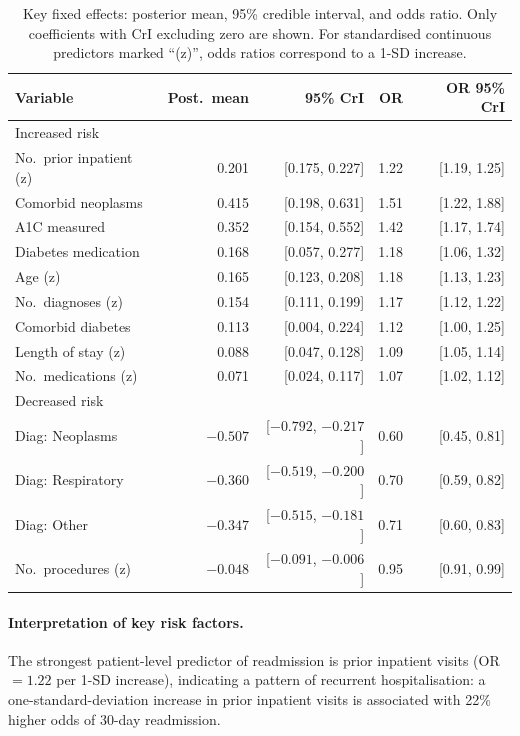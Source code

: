 \documentclass[10pt]{article}
\begin{document}
\begin{table}[H]
\centering
\small
\caption{Key fixed effects: posterior mean, 95\% credible interval, and odds
ratio.  Only coefficients with CrI excluding zero are shown. For standardised
continuous predictors marked ``(z)'', odds ratios correspond to a 1-SD increase.}
\label{tab:fixed}
\begin{tabular}{lrrrr}
\toprule
Variable & Post.\ mean & 95\% CrI & OR & OR 95\% CrI \\
\midrule
Increased risk \\
\quad No.\ prior inpatient (z) & 0.201 & [0.175, 0.227] & 1.22 & [1.19, 1.25] \\
\quad Comorbid neoplasms & 0.415 & [0.198, 0.631] & 1.51 & [1.22, 1.88] \\
\quad A1C measured & 0.352 & [0.154, 0.552] & 1.42 & [1.17, 1.74] \\
\quad Diabetes medication & 0.168 & [0.057, 0.277] & 1.18 & [1.06, 1.32] \\
\quad Age (z) & 0.165 & [0.123, 0.208] & 1.18 & [1.13, 1.23] \\
\quad No.\ diagnoses (z) & 0.154 & [0.111, 0.199] & 1.17 & [1.12, 1.22] \\
\quad Comorbid diabetes & 0.113 & [0.004, 0.224] & 1.12 & [1.00, 1.25] \\
\quad Length of stay (z) & 0.088 & [0.047, 0.128] & 1.09 & [1.05, 1.14] \\
\quad No.\ medications (z) & 0.071 & [0.024, 0.117] & 1.07 & [1.02, 1.12] \\
\midrule
Decreased risk \\
\quad Diag: Neoplasms & $-0.507$ & [$-0.792$, $-0.217$] & 0.60 & [0.45, 0.81] \\
\quad Diag: Respiratory & $-0.360$ & [$-0.519$, $-0.200$] & 0.70 & [0.59, 0.82] \\
\quad Diag: Other & $-0.347$ & [$-0.515$, $-0.181$] & 0.71 & [0.60, 0.83] \\
\quad No.\ procedures (z) & $-0.048$ & [$-0.091$, $-0.006$] & 0.95 & [0.91, 0.99] \\
\bottomrule
\end{tabular}
\end{table}

\paragraph{Interpretation of key risk factors.}
The strongest patient-level predictor of readmission is prior inpatient visits
(OR $= 1.22$ per 1-SD increase), indicating a pattern of recurrent
hospitalisation: a one-standard-deviation increase in prior inpatient visits is
associated with 22\% higher odds of 30-day readmission.
\end{document}
